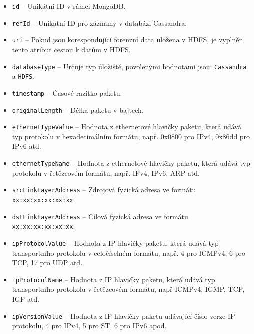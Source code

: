 \begin{itemize}
    \item \texttt{id} -- Unikátní ID v rámci MongoDB.
    
    \item \texttt{refId} -- Unikátní ID pro záznamy v databázi Cassandra.
    
    \item \texttt{uri} -- Pokud jsou korespondující forenzní data uložena v HDFS, je vyplněn tento atribut cestou k datům v HDFS.
    
    \item \texttt{databaseType} -- Určuje typ úložiště, povolenými hodnotami jsou: \texttt{Cassandra} a \texttt{HDFS}.
    
    \item \texttt{timestamp} -- Časové razítko paketu.
    
    \item \texttt{originalLength} -- Délka paketu v bajtech.
    
    \item \texttt{ethernetTypeValue} -- Hodnota z ethernetové hlavičky paketu, která udává typ protokolu v hexadecimálním formátu, např. 0x0800 pro IPv4, 0x86dd pro IPv6 atd.
    
    \item \texttt{ethernetTypeName} -- Hodnota z ethernetové hlavičky paketu, která udává typ protokolu v řetězcovém formátu, např. IPv4, IPv6, ARP atd.
    
    \item \texttt{srcLinkLayerAddress} -- Zdrojová fyzická adresa ve formátu \texttt{xx:xx:xx:xx:xx:xx}.
    
    \item \texttt{dstLinkLayerAddress} -- Cílová fyzická adresa ve formátu \texttt{xx:xx:xx:xx:xx:xx}.
    
    \item \texttt{ipProtocolValue} -- Hodnota z IP hlavičky paketu, která udává typ transportního protokolu v celočíselném formátu, např. 4 pro ICMPv4, 6 pro TCP, 17 pro UDP atd.
    
    \item \texttt{ipProtocolName} -- Hodnota z IP hlavičky paketu, která udává typ transportního protokolu v řetězcovém formátu, např ICMPv4, IGMP, TCP, IGP atd.
    
    \item \texttt{ipVersionValue} -- Hodnota z IP hlavičky paketu udávající číslo verze IP protokolu, 4 pro IPv4, 5 pro ST, 6 pro IPv6 apod.
    

\end{itemize}
